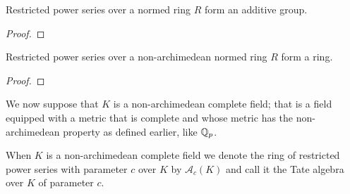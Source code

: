 \begin{theorem}
  \label{PowerSeries.Restricted.IsGroup}
  \leanok
  Restricted power series over a normed ring $R$ form an additive group.
\end{theorem}

\begin{proof}
  \leanok
\end{proof}

\begin{theorem}
  \label{PowerSeries.Restricted.IsRing}
  \leanok
  Restricted power series over a non-archimedean normed ring $R$ form a ring.
\end{theorem}

\begin{proof}
  \leanok
\end{proof}

We now suppose that $K$ is a non-archimedean complete field; that is a field equipped with a metric
that is complete and whose metric has the non-archimedean property as defined earlier, like $\mathbb{Q}_p$.

\begin{definition}
    When $K$ is a non-archimedean complete field we denote the ring of restricted power series with
    parameter $c$ over $K$ by $\mathcal{A}_c(K)$ and call it the Tate algebra over $K$ of parameter
    $c$.
\end{definition}

